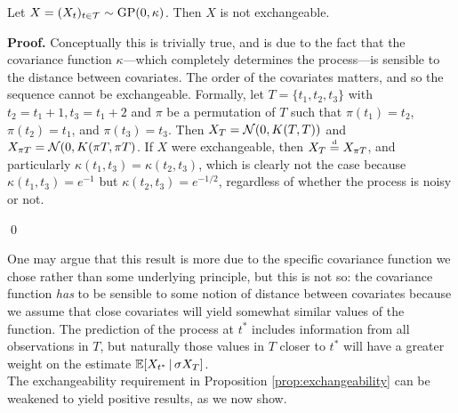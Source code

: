 \begin{proposition} \label{prop:exchangeability}
	Let $X = (X_t)_{t \in \mathcal{T}} \sim \mathrm{GP} (0, \kappa)$. Then $X$ is not exchangeable.
\end{proposition}

\textbf{Proof. \hspace{0.05cm}} Conceptually this is trivially true, and is due to the fact that the covariance function $\kappa$---which completely determines the process---is sensible to the distance between covariates. The order of the covariates matters, and so the sequence cannot be exchangeable. Formally, let $T = \{ t_1, t_2, t_3 \}$ with $t_2 = t_1 + 1, t_3 = t_1 + 2$ and $\pi$ be a permutation of $T$ such that $\pi(t_1) = t_2$,  $\pi(t_2) = t_1$, and $\pi(t_3) = t_3$. Then $X_T = \mathcal{N} (0, K(T, T))$ and $X_{\pi T} = \mathcal{N}(0, K(\pi T, \pi T)$. If $X$ were exchangeable, then $X_T \stackrel{\text{\rm\tiny d}}{=} X_{\pi T}$, and particularly $\kappa(t_1, t_3) = \kappa(t_2, t_3)$, which is clearly not the case because $\kappa(t_1, t_3) = e^{-1}$ but $\kappa(t_2, t_3) = e^{-1/2}$, regardless of whether the process is noisy or not.

\qed

\vskip 0.2cm

One may argue that this result is more due to the specific covariance function we chose rather than some underlying principle, but this is not so: the covariance function \textit{has} to be sensible to some notion of distance between covariates because we assume that close covariates will yield somewhat similar values of the function. The prediction of the process at $t^{*}$ includes information from all observations in $T$, but naturally those values in $T$ closer to $t^{*}$ will have a greater weight on the estimate $\mathbb{E} [X_{t^{*}} \, | \, \sigma X_T ]$. \\


The exchangeability requirement in Proposition \ref{prop:exchangeability} can be weakened to yield positive results, as we now show.



